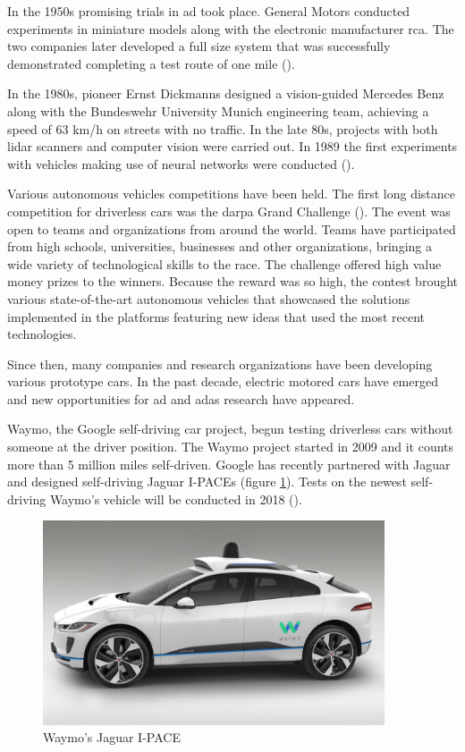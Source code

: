 In the 1950s promising trials in \gls{ad} took place. General Motors conducted experiments in miniature models along with the electronic manufacturer \gls{rca}. The two companies later developed a full size system that was successfully demonstrated completing a test route of one mile (\cite{Kroger2016}).

In the 1980s, pioneer Ernst Dickmanns designed a vision-guided Mercedes Benz along with the Bundeswehr University Munich engineering team, achieving a speed of 63 km/h on streets with no traffic. In the late 80s, projects with both \gls{lidar} scanners and computer vision were carried out. In 1989 the first experiments with vehicles making use of neural networks were conducted (\cite{Pomerleau1989}).

Various autonomous vehicles competitions have been held. The first long distance competition for driverless cars was the \gls{darpa} Grand Challenge (\cite{DARPA}). The event was open to teams and organizations from around the world. Teams have participated from high schools, universities, businesses and other organizations, bringing a wide variety of technological skills to the race. The challenge offered high value money prizes to the winners. Because the reward was so high, the contest brought various state-of-the-art autonomous vehicles that showcased the solutions implemented in the platforms featuring new ideas that used the most recent technologies.

Since then, many companies and research organizations have been developing various prototype cars. In the past decade, electric motored cars have emerged and new opportunities for \gls{ad} and \gls{adas} research have appeared. 

Waymo, the Google self-driving car project, begun testing driverless cars without someone at the driver position. The Waymo project started in 2009 and it counts more than 5 million miles self-driven. Google has recently partnered with Jaguar and designed self-driving Jaguar I-PACEs (figure \ref{fig:waymo}). Tests on the newest self-driving Waymo's vehicle will be conducted in 2018 (\cite{Waymo}).


\begin{figure}[htp]
	
	\centering
	\includegraphics[width=0.9\textwidth]{capstate/imgs/waymo}
	
	\caption{Waymo's Jaguar I-PACE}
	\label{fig:waymo}
	
\end{figure}

